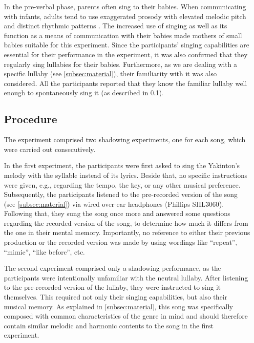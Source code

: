 In the pre-verbal phase, parents often sing to their babies.
When communicating with infants, adults tend to use exaggerated prosody with elevated melodic pitch and distinct rhythmic patterns \citep{Fernald1991prosody}.
The increased use of singing as well as its function as a means of communication with their babies \citep[see][]{Street2003mothers,Papouvsek1991meanings} made mothers of small babies suitable for this experiment.
Since the participants' singing capabilities are essential for their performance in the experiment, it was also confirmed that they regularly sing lullabies for their babies.
Furthermore, as we are dealing with a specific lullaby (see \cref{subsec:material}), their familiarity with it was also considered.
All the participants reported that they know the familiar lullaby well enough to spontaneously sing it (as described in \cref{subsec:procedure}).

\subsection{Procedure}
\label{subsec:procedure}

The experiment comprised two shadowing experiments, one for each song, which were carried out consecutively.

In the first experiment, the participants were first asked to sing the Yakinton's melody with the syllable \textipa{[na]} instead of its lyrics.
Beside that, no specific instructions were given, e.g., regarding the tempo, the key, or any other musical preference.
Subsequently, the participants listened to the pre-recorded version of the song (see \cref{subsec:material}) via wired over-ear headphones (Phillips SHL3060).
Following that, they sung the song once more and answered some questions regarding the recorded version of the song, to determine how much it differs from the one in their mental memory.
Importantly, no reference to either their previous production or the recorded version was made by using wordings like \enquote{repeat}, \enquote{mimic}, \enquote{like before}, etc.

The second experiment comprised only a shadowing performance, as the participants were intentionally unfamiliar with the neutral lullaby.
After listening to the pre-recorded version of the lullaby, they were instructed to sing it themselves.
This required not only their singing capabilities, but also their musical memory.
As explained in \cref{subsec:material}, this song was specifically composed with common characteristics of the genre in mind and should therefore contain similar melodic and harmonic contents to the song in the first experiment.

